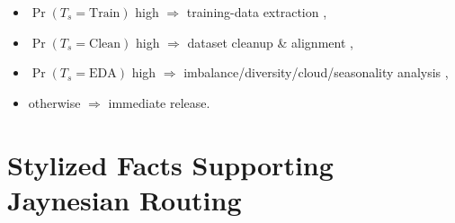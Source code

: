 \documentclass{article}
\begin{document}
\begin{itemize}
  \item \(\Pr(T_s=\mathrm{Train})\) high \(\Rightarrow\) training-data extraction \citep{BigEarthNet2019},
  \item \(\Pr(T_s=\mathrm{Clean})\) high \(\Rightarrow\) dataset cleanup \& alignment \citep{ESSD2023},
  \item \(\Pr(T_s=\mathrm{EDA})\) high \(\Rightarrow\) imbalance/diversity/cloud/seasonality analysis \citep{Demir2025},
  \item otherwise \(\Rightarrow\) immediate release.
\end{itemize}

\section*{Stylized Facts Supporting Jaynesian Routing}
\end{document}

